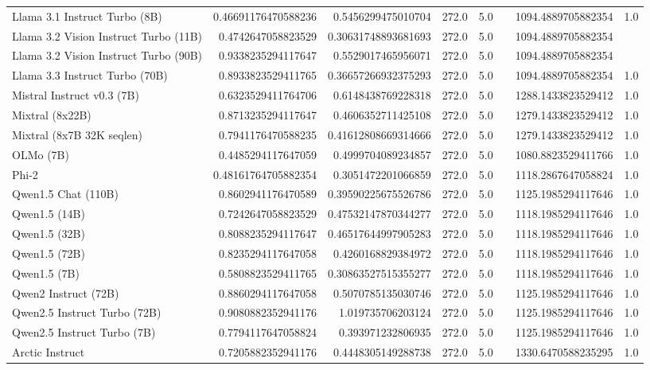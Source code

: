 \begin{table}[htp]
{\begin{tabular}{lrrrrrrr}
Llama 3.1 Instruct Turbo (8B) & 0.46691176470588236 & 0.5456299475010704 & 272.0 & 5.0 &  & 1094.4889705882354 & 1.0 \\
Llama 3.2 Vision Instruct Turbo (11B) & 0.4742647058823529 & 0.30631748893681693 & 272.0 & 5.0 &  & 1094.4889705882354 &  \\
Llama 3.2 Vision Instruct Turbo (90B) & 0.9338235294117647 & 0.5529017465956071 & 272.0 & 5.0 &  & 1094.4889705882354 &  \\
Llama 3.3 Instruct Turbo (70B) & 0.8933823529411765 & 0.36657266932375293 & 272.0 & 5.0 &  & 1094.4889705882354 & 1.0 \\
Mistral Instruct v0.3 (7B) & 0.6323529411764706 & 0.6148438769228318 & 272.0 & 5.0 &  & 1288.1433823529412 & 1.0 \\
Mixtral (8x22B) & 0.8713235294117647 & 0.4606352711425108 & 272.0 & 5.0 &  & 1279.1433823529412 & 1.0 \\
Mixtral (8x7B 32K seqlen) & 0.7941176470588235 & 0.41612808669314666 & 272.0 & 5.0 &  & 1279.1433823529412 & 1.0 \\
OLMo (7B) & 0.4485294117647059 & 0.4999704089234857 & 272.0 & 5.0 &  & 1080.8823529411766 & 1.0 \\
Phi-2 & 0.48161764705882354 & 0.3051472201066859 & 272.0 & 5.0 &  & 1118.2867647058824 & 1.0 \\
Qwen1.5 Chat (110B) & 0.8602941176470589 & 0.39590225675526786 & 272.0 & 5.0 &  & 1125.1985294117646 & 1.0 \\
Qwen1.5 (14B) & 0.7242647058823529 & 0.47532147870344277 & 272.0 & 5.0 &  & 1118.1985294117646 & 1.0 \\
Qwen1.5 (32B) & 0.8088235294117647 & 0.46517644997905283 & 272.0 & 5.0 &  & 1118.1985294117646 & 1.0 \\
Qwen1.5 (72B) & 0.8235294117647058 & 0.4260168829384972 & 272.0 & 5.0 &  & 1118.1985294117646 & 1.0 \\
Qwen1.5 (7B) & 0.5808823529411765 & 0.30863527515355277 & 272.0 & 5.0 &  & 1118.1985294117646 & 1.0 \\
Qwen2 Instruct (72B) & 0.8860294117647058 & 0.5070785135030746 & 272.0 & 5.0 &  & 1125.1985294117646 & 1.0 \\
Qwen2.5 Instruct Turbo (72B) & 0.9080882352941176 & 1.019735706203124 & 272.0 & 5.0 &  & 1125.1985294117646 & 1.0 \\
Qwen2.5 Instruct Turbo (7B) & 0.7794117647058824 & 0.393971232806935 & 272.0 & 5.0 &  & 1125.1985294117646 & 1.0 \\
Arctic Instruct & 0.7205882352941176 & 0.4448305149288738 & 272.0 & 5.0 &  & 1330.6470588235295 & 1.0 \\

\end{tabular}}
\end{table}
